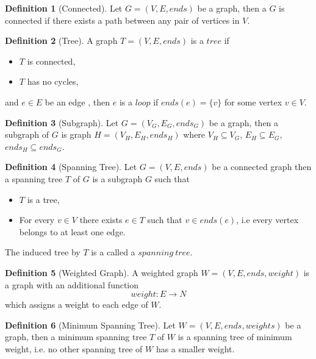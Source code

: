 \documentclass{report}
\theoremstyle{plain}
\theoremstyle{definition}
\newtheorem{definition}{Definition}
\theoremstyle{remark}
\begin{document}
\begin{definition}[Connected]
Let $G = (V, E, ends)$ be a graph, then a $G$ is connected if there exists a path between any pair of vertices in $V$.
\end{definition}

\begin{definition}[Tree]
A graph $T = (V, E, ends)$ is a $tree$ if
\begin{itemize}
\item $T$ is connected,
\item $T$ has no cycles,
\end{itemize}
and $e \in E$ be an edge , then $e$ is a $loop$ if $ends(e) = \{v\}$ for some vertex $v \in V$.
\end{definition}

\begin{definition}[Subgraph]
Let $G = (V_G, E_G, ends_G)$ be a graph, then a subgraph of $G$ is graph $H = (V_H, E_H, ends_H)$ where $V_H \subseteq V_G$, $E_H \subseteq E_G$, $ends_H \subseteq ends_G$.
\end{definition}

\begin{definition}[Spanning Tree]
Let $G = (V, E, ends)$ be a connected graph then a spanning tree $T$ of $G$ is a subgraph $G$ such that
\begin{itemize}
\item $T$ is a tree,
\item For every $v \in V$ there exists $e \in T$ such that $v \in ends(e)$, i.e every vertex belongs to at least one edge.
\end{itemize}
The induced tree by $T$ is a called a $spanning \  tree$.
\end{definition}

\begin{definition}[Weighted Graph]
A weighted graph $W = (V, E, ends, weight)$ is a graph with an additional function
  \begin{equation}
  weight:E\to N
  \end{equation}
which assigns a weight to each edge of $W$.
\end{definition}

\begin{definition}[Minimum Spanning Tree]
Let $W = (V, E, ends, weights)$ be a graph, then a minimum spanning tree $T$ of $W$ is a spanning tree of minimum weight, i.e. no other spanning tree of $W$ has a smaller weight.
\end{definition}
\end{document}
